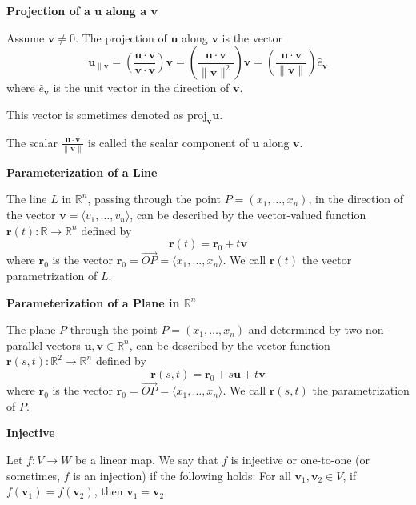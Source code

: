 \documentclass{article}
\newcommand{\R}{\mathbb{R}}
\begin{document}
\vspace{0.5cm}

\noindent \textbf{Projection of a \( \bm{u}\) along a \( \bm{v}\)}

Assume \( \bm{v} \neq 0 \). The projection of \( \bm{u} \) along \( \bm{v} \) is the vector
\[ \bm{u}_{\parallel \bm{v}} = \left( \frac{\bm{u} \cdot \bm{v}}{\bm{v} \cdot \bm{v}} \right) \bm{v} = \left( \frac{\bm{u} \cdot \bm{v}}{\|\bm{v}\|^2} \right) \bm{v} = \left( \frac{\bm{u} \cdot \bm{v}}{\|\bm{v}\|} \right) \hat{e}_{\bm{v}} \]
where \( \hat{e}_{\bm{v}} \) is the unit vector in the direction of \( \bm{v} \). 

This vector is sometimes denoted as \( \text{proj}_{\bm{v}} \bm{u} \).

The scalar \( \frac{\bm{u} \cdot \bm{v}}{\|\bm{v}\|} \) is called the scalar component of \( \bm{u} \) along \( \bm{v} \).

\vspace{0.5cm}

\noindent \textbf{Parameterization of a Line}

The line \( L \) in \( \mathbb{R}^n \), passing through the point \( P = (x_1, \ldots, x_n) \), in the direction of the vector \( \bm{v} = \langle v_1, \ldots, v_n \rangle \), can be described by the vector-valued function \( \bm{r}(t) \colon \mathbb{R} \rightarrow \mathbb{R}^n \) defined by
\[ \bm{r}(t) = \bm{r}_0 + t\bm{v} \]
where \( \bm{r}_0 \) is the vector \( \bm{r}_0 = \overrightarrow{OP} = \langle x_1, \ldots, x_n \rangle \). We call \( \bm{r}(t) \) the vector parametrization of \( L \).

\vspace{0.5cm}

\noindent \textbf{Parameterization of a Plane in \( \R^n \)}

The plane \( P \) through the point \( P = (x_1, \ldots, x_n) \) and determined by two non-parallel vectors \( \bm{u}, \bm{v} \in \mathbb{R}^n \), can be described by the vector function \( \bm{r}(s, t) \colon \mathbb{R}^2 \rightarrow \mathbb{R}^n \) defined by
\[ \bm{r}(s,t) = \bm{r}_0 + s\bm{u} + t\bm{v} \]
where \( \bm{r}_0 \) is the vector \( \bm{r}_0 = \overrightarrow{OP} = \langle x_1, \ldots, x_n \rangle \). We call \( \bm{r}(s,t) \) the parametrization of \( P \).

\vspace{0.5cm}

\noindent \textbf{Injective}

Let \( f: V \rightarrow W \) be a linear map. We say that \( f \) is injective or one-to-one (or sometimes, \( f \) is an injection) if the following holds:
For all \( \bm{v}_1, \bm{v}_2 \in V \), if \( f(\bm{v}_1) = f(\bm{v}_2) \), then \( \bm{v}_1 = \bm{v}_2 \).
\end{document}
